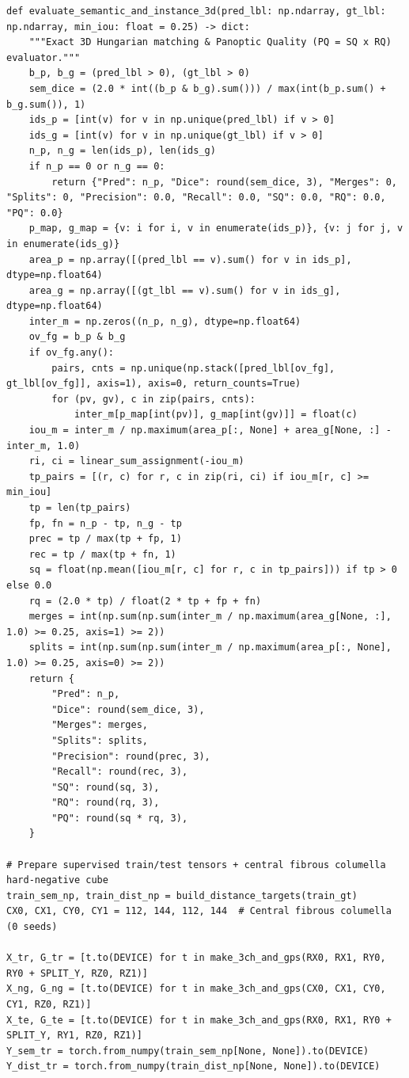 \documentclass[10pt,a4paper]{article}
\begin{document}
\begin{codebox}[{In [4] $\cdot$ Python --- Step 4 -- Controlled 5-model ablation study (SSL warm-start, Organ-GPS, p=1 vs p=3, calibration)}]
\begin{lstlisting}[style=pybmed]
def evaluate_semantic_and_instance_3d(pred_lbl: np.ndarray, gt_lbl: np.ndarray, min_iou: float = 0.25) -> dict:
    """Exact 3D Hungarian matching & Panoptic Quality (PQ = SQ x RQ) evaluator."""
    b_p, b_g = (pred_lbl > 0), (gt_lbl > 0)
    sem_dice = (2.0 * int((b_p & b_g).sum())) / max(int(b_p.sum() + b_g.sum()), 1)
    ids_p = [int(v) for v in np.unique(pred_lbl) if v > 0]
    ids_g = [int(v) for v in np.unique(gt_lbl) if v > 0]
    n_p, n_g = len(ids_p), len(ids_g)
    if n_p == 0 or n_g == 0:
        return {"Pred": n_p, "Dice": round(sem_dice, 3), "Merges": 0, "Splits": 0, "Precision": 0.0, "Recall": 0.0, "SQ": 0.0, "RQ": 0.0, "PQ": 0.0}
    p_map, g_map = {v: i for i, v in enumerate(ids_p)}, {v: j for j, v in enumerate(ids_g)}
    area_p = np.array([(pred_lbl == v).sum() for v in ids_p], dtype=np.float64)
    area_g = np.array([(gt_lbl == v).sum() for v in ids_g], dtype=np.float64)
    inter_m = np.zeros((n_p, n_g), dtype=np.float64)
    ov_fg = b_p & b_g
    if ov_fg.any():
        pairs, cnts = np.unique(np.stack([pred_lbl[ov_fg], gt_lbl[ov_fg]], axis=1), axis=0, return_counts=True)
        for (pv, gv), c in zip(pairs, cnts):
            inter_m[p_map[int(pv)], g_map[int(gv)]] = float(c)
    iou_m = inter_m / np.maximum(area_p[:, None] + area_g[None, :] - inter_m, 1.0)
    ri, ci = linear_sum_assignment(-iou_m)
    tp_pairs = [(r, c) for r, c in zip(ri, ci) if iou_m[r, c] >= min_iou]
    tp = len(tp_pairs)
    fp, fn = n_p - tp, n_g - tp
    prec = tp / max(tp + fp, 1)
    rec = tp / max(tp + fn, 1)
    sq = float(np.mean([iou_m[r, c] for r, c in tp_pairs])) if tp > 0 else 0.0
    rq = (2.0 * tp) / float(2 * tp + fp + fn)
    merges = int(np.sum(np.sum(inter_m / np.maximum(area_g[None, :], 1.0) >= 0.25, axis=1) >= 2))
    splits = int(np.sum(np.sum(inter_m / np.maximum(area_p[:, None], 1.0) >= 0.25, axis=0) >= 2))
    return {
        "Pred": n_p,
        "Dice": round(sem_dice, 3),
        "Merges": merges,
        "Splits": splits,
        "Precision": round(prec, 3),
        "Recall": round(rec, 3),
        "SQ": round(sq, 3),
        "RQ": round(rq, 3),
        "PQ": round(sq * rq, 3),
    }

# Prepare supervised train/test tensors + central fibrous columella hard-negative cube
train_sem_np, train_dist_np = build_distance_targets(train_gt)
CX0, CX1, CY0, CY1 = 112, 144, 112, 144  # Central fibrous columella (0 seeds)

X_tr, G_tr = [t.to(DEVICE) for t in make_3ch_and_gps(RX0, RX1, RY0, RY0 + SPLIT_Y, RZ0, RZ1)]
X_ng, G_ng = [t.to(DEVICE) for t in make_3ch_and_gps(CX0, CX1, CY0, CY1, RZ0, RZ1)]
X_te, G_te = [t.to(DEVICE) for t in make_3ch_and_gps(RX0, RX1, RY0 + SPLIT_Y, RY1, RZ0, RZ1)]
Y_sem_tr = torch.from_numpy(train_sem_np[None, None]).to(DEVICE)
Y_dist_tr = torch.from_numpy(train_dist_np[None, None]).to(DEVICE)


\end{lstlisting}
\end{codebox}
\end{document}
